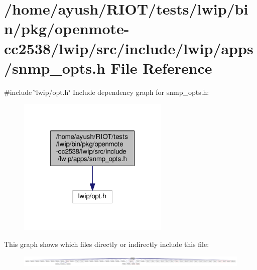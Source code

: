 \hypertarget{openmote-cc2538_2lwip_2src_2include_2lwip_2apps_2snmp__opts_8h}{}\section{/home/ayush/\+R\+I\+O\+T/tests/lwip/bin/pkg/openmote-\/cc2538/lwip/src/include/lwip/apps/snmp\+\_\+opts.h File Reference}
\label{openmote-cc2538_2lwip_2src_2include_2lwip_2apps_2snmp__opts_8h}
{\ttfamily \#include \char`\"{}lwip/opt.\+h\char`\"{}}\newline
Include dependency graph for snmp\+\_\+opts.\+h\+:
\nopagebreak
\begin{figure}[H]
\begin{center}
\leavevmode
\includegraphics[width=205pt]{openmote-cc2538_2lwip_2src_2include_2lwip_2apps_2snmp__opts_8h__incl}
\end{center}
\end{figure}
This graph shows which files directly or indirectly include this file\+:
\nopagebreak
\begin{figure}[H]
\begin{center}
\leavevmode
\includegraphics[width=350pt]{openmote-cc2538_2lwip_2src_2include_2lwip_2apps_2snmp__opts_8h__dep__incl}
\end{center}
\end{figure}
